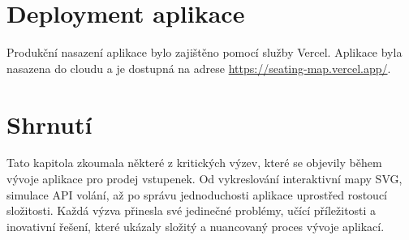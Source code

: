 \section{Deployment aplikace}
\label{sec:vyzvy-a-problemy-deployment}
Produkční nasazení aplikace bylo zajištěno pomocí služby Vercel. Aplikace byla nasazena do cloudu a je dostupná na adrese \url{https://seating-map.vercel.app/}.

\section{Shrnutí}
\label{sec:vyzvy-a-problemy-shrnuti}
Tato kapitola zkoumala některé z kritických výzev, které se objevily během vývoje aplikace pro prodej vstupenek.
Od vykreslování interaktivní mapy SVG, simulace API volání, až po správu jednoduchosti aplikace uprostřed rostoucí složitosti.
Každá výzva přinesla své jedinečné problémy, učící příležitosti a inovativní řešení, které ukázaly složitý a nuancovaný proces vývoje aplikací.
